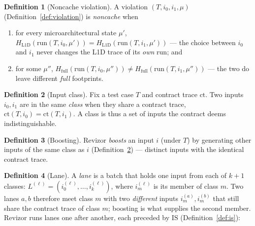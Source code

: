 \documentclass[11pt]{article}
\theoremstyle{definition}
\newtheorem{definition}{Definition}
\theoremstyle{plain}
\newcommand{\ct}{\mathrm{ct}}
\newcommand{\run}{\mathrm{run}}
\newcommand{\IS}{\mathrm{IS}}
\newcommand{\HL}{H_{\mathrm{L1D}}}
\newcommand{\HF}{H_{\mathrm{full}}}
\newcommand{\lane}[1]{L^{(#1)}}
\newcommand{\inp}[2]{i_{#1}^{(#2)}}
\begin{document}
\begin{definition}[Noncache violation]
\label{def:xio}
A violation $(T,i_0,i_1,\mu)$ (Definition~\ref{def:violation}) is \emph{noncache} when
\begin{enumerate}[label=(\alph*),nosep,leftmargin=2.2em]
\item for every microarchitectural state $\mu'$,
      $\HL(\run(T,i_0,\mu')) = \HL(\run(T,i_1,\mu'))$ --- the choice between $i_0$ and
      $i_1$ never changes the L1D trace of its \emph{own} run; and
\item for some $\mu''$, $\HF(\run(T,i_0,\mu'')) \neq \HF(\run(T,i_1,\mu''))$ --- the two
      do leave different \emph{full} footprints.
\end{enumerate}
\end{definition}

\begin{definition}[Input class]
\label{def:class}
Fix a test case $T$ and contract trace $\ct$. Two inputs $i_0,i_1$ are in the same
\emph{class} when they share a contract trace, $\ct(T,i_0)=\ct(T,i_1)$. A class is thus
a set of inputs the contract deems indistinguishable.
\end{definition}

\begin{definition}[Boosting]
\label{def:boost}
Revizor \emph{boosts} an input $i$ (under $T$) by generating other inputs of the same
class as $i$ (Definition~\ref{def:class}) --- distinct inputs with the identical
contract trace.
\end{definition}

\begin{definition}[Lane]
\label{def:lane}
A \emph{lane} is a batch that holds one input from each of $k+1$ classes:
$\lane{\ell}=(\inp{0}{\ell},\dots,\inp{k}{\ell})$, where $\inp{m}{\ell}$ is its member
of class $m$. Two lanes $a,b$ therefore meet class $m$ with two \emph{different} inputs
$\inp{m}{a},\inp{m}{b}$ that still share the contract trace of class $m$; boosting is
what supplies the second member. Revizor runs lanes one after another, each preceded by
$\IS$ (Definition~\ref{def:is}):
\end{definition}

\begin{center}
\end{center}
\end{document}

